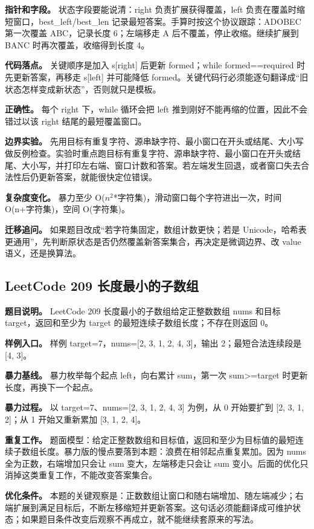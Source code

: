 \textbf{指针和字段。} 状态字段要能说清：right 负责扩展获得覆盖，left 负责在覆盖时缩短窗口，best\_left/best\_len 记录最短答案。手算时按这个协议跟踪：ADOBEC 第一次覆盖 ABC，记录长度 6；左端移走 A 后不覆盖，停止收缩。继续扩展到 BANC 时再次覆盖，收缩得到长度 4。

\textbf{代码落点。} 关键顺序是加入 s[right] 后更新 formed；while formed==required 时先更新答案，再移走 s[left] 并可能降低 formed。关键代码行必须能逐句翻译成“旧状态怎样变成新状态”，否则就只是模板。

\textbf{正确性。} 每个 right 下，while 循环会把 left 推到刚好不能再缩的位置，因此不会错过以该 right 结尾的最短覆盖窗口。

\textbf{边界实验。} 先用目标有重复字符、源串缺字符、最小窗口在开头或结尾、大小写做反例检查。实验时重点跑目标有重复字符、源串缺字符、最小窗口在开头或结尾、大小写，并打印左右端、窗口计数和答案。若左端发生回退，或者窗口失去合法性后仍更新答案，就能很快定位错误。

\textbf{复杂度变化。} 暴力至少 O(\ensuremath{n^{2}}*字符集)，滑动窗口每个字符进出一次，时间 O(n+字符集)，空间 O(字符集)。

\textbf{迁移追问。} 如果题目改成“若字符集固定，数组计数更快；若是 Unicode，哈希表更通用”，先判断原状态是否仍然覆盖新答案集合，再决定是微调边界、改 value 语义，还是换算法。

\subsection{LeetCode 209 长度最小的子数组}

\textbf{题目说明。} LeetCode 209 长度最小的子数组给定正整数数组 nums 和目标 target，返回和至少为 target 的最短连续子数组长度；不存在则返回 0。

\textbf{样例入口。} 样例 target=7，nums=[2, 3, 1, 2, 4, 3]，输出 2；最短合法连续段是 [4, 3]。

\textbf{暴力基线。} 暴力枚举每个起点 left，向右累计 sum，第一次 sum>=target 时更新长度，再换下一个起点。

\textbf{暴力过程。} 以 target=7、nums=[2, 3, 1, 2, 4, 3] 为例，从 0 开始要扩到 [2, 3, 1, 2]；从 1 开始又重新累加 [3, 1, 2, 4]。

\textbf{重复工作。} 题面模型：给定正整数数组和目标值，返回和至少为目标值的最短连续子数组长度。暴力版的慢点要落到本题：浪费在相邻起点重复累加。因为 nums 全为正数，右端增加只会让 sum 变大，左端移走只会让 sum 变小。后面的优化只消掉这类重复工作，不能改变答案集合。

\textbf{优化条件。} 本题的关键观察是：正数数组让窗口和随右端增加、随左端减少；右端扩展到满足目标后，不断左移缩短并更新答案。这句话必须能翻译成可维护状态；如果题目条件改变后观察不再成立，就不能继续套原来的写法。

